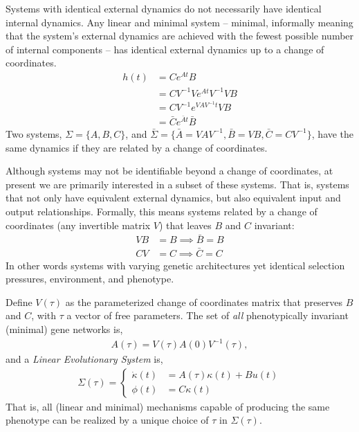 \documentclass[9 pt]{article}
\newcommand{\1}{\mathbbm{1}}
\begin{document}
  Systems with identical external dynamics do not necessarily have identical internal dynamics. Any linear and minimal system -- minimal, informally meaning that the system's external dynamics are achieved with the fewest possible number of internal components -- has identical external dynamics up to a change of coordinates. 
  \begin{align}
    h(t) &= C e^{A t} B \\
    &= C V^{-1} V e^{A t} V^{-1} V B \\
    &= C V^{-1} e^{V A V^{-1} t} V B \\
    &= \bar{C} e^{\bar{A} t} \bar{B}
  \end{align}
  Two systems, $\Sigma = \{ A, B, C \}$, and $\bar{\Sigma} = \{\bar{A} = VAV^{-1}, \bar{B} = VB, \bar{C} = CV^{-1} \}$, have the same dynamics if they are related by a change of coordinates. 

  Although systems may not be identifiable beyond a change of coordinates, at present we are primarily interested in a subset of these systems. That is, systems that not only have equivalent external dynamics, but also equivalent input and output relationships. Formally, this means systems related by a change of coordinates (any invertible matrix $V$) that leaves $B$ and $C$ invariant:
  \begin{align}
    VB &= B \implies \bar{B} = B \\
    CV &= C \implies \bar{C} = C
  \end{align}
  In other words systems with varying genetic architectures yet identical selection pressures, environment, and phenotype. 

  Define $V(\tau)$ as the parameterized change of coordinates matrix that preserves $B$ and $C$, with $\tau$ a vector of free parameters. The set of \emph{all} phenotypically invariant (minimal) gene networks is, 
  \begin{align}
    A(\tau) = V(\tau) A(0) V^{-1}(\tau) ,
  \end{align}
  and a \emph{Linear Evolutionary System} is, 
  \begin{align}
    \Sigma(\tau) = \left\{ \begin{array}{ll} \dot{\kappa}(t) &= A(\tau) \kappa(t) + B u(t) \\ \phi(t) &= C \kappa(t) \end{array} \right .
  \end{align}
  That is, all (linear and minimal) mechanisms capable of producing the same phenotype can be realized by a unique choice of $\tau$ in $\Sigma(\tau)$.
\end{document}
